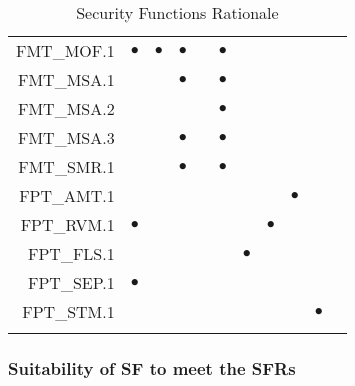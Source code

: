 \documentclass[12pt,english]{scrbook}
\newcommand{\oh}{$\bullet$}
\begin{document}
\begin{longtable}{rRRRRRRRRRR}
FMT\_MOF.1          & \oh        &  \oh           &  \oh          &          & \oh           &                        &                    &                 &                    \\   
FMT\_MSA.1          &            &                &  \oh          &          & \oh           &                        &                    &                 &                    \\   
FMT\_MSA.2          &            &                &               &          & \oh           &                        &                    &                 &                    \\   
FMT\_MSA.3          &            &                &  \oh          &          & \oh           &                        &                    &                 &                    \\   
FMT\_SMR.1          &            &                &  \oh          &          & \oh           &                        &                    &                 &                    \\   
FPT\_AMT.1          &            &                &               &          &               &                        &                    &    \oh          &                    \\   
FPT\_RVM.1          & \oh        &                &               &          &               &                        &  \oh               &                 &                    \\   
FPT\_FLS.1          &            &                &               &          &               &     \oh                &                    &                 &                    \\   
FPT\_SEP.1          &  \oh       &                &               &          &               &                        &                    &                 &                    \\ 
FPT\_STM.1          &            &                &               &          &               &                        &                    &                 &   \oh              \\       
    \bottomrule
    \caption{Security Functions Rationale} 

\end{longtable}

\subsubsection{Suitability of SF to meet the SFRs}
\end{document}
